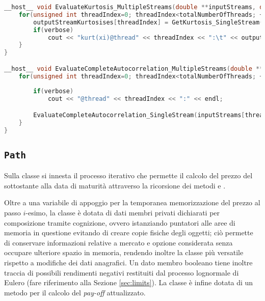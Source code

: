\begin{lstlisting}[language=C++, caption={\texttt{libraries/CoreLibraries/RandomGenerator/CorrelationToolbox.cu}}]
__host__ void EvaluateKurtosis_MultipleStreams(double **inputStreams, double *inputStreamAverages, double *inputStreamVariances, double *outputStreamKurtosises, unsigned int totalNumberOfThreads, unsigned int numbersToGeneratePerThread, bool verbose){
	for(unsigned int threadIndex=0; threadIndex<totalNumberOfThreads; ++threadIndex){
		outputStreamKurtosises[threadIndex] = GetKurtosis_SingleStream(inputStreams[threadIndex], inputStreamAverages[threadIndex], inputStreamVariances[threadIndex], numbersToGeneratePerThread);
		if(verbose)
			cout << "kurt(xi)@thread" << threadIndex << ":\t" << outputStreamKurtosises[threadIndex] << endl;
	}
}

__host__ void EvaluateCompleteAutocorrelation_MultipleStreams(double **inputStreams, double **outputStreamCorrelations, unsigned int totalNumberOfThreads, unsigned int numbersToGeneratePerThread, bool verbose){
	for(unsigned int threadIndex=0; threadIndex<totalNumberOfThreads; ++threadIndex){
				
		if(verbose)
			cout << "@thread" << threadIndex << ":" << endl;

		EvaluateCompleteAutocorrelation_SingleStream(inputStreams[threadIndex], outputStreamCorrelations[threadIndex], numbersToGeneratePerThread, verbose);
	}
}
\end{lstlisting}

\subsection{\texttt{Path}}
Sulla classe  si innesta il processo iterativo che permette il calcolo del prezzo del sottostante alla data di maturità attraverso la ricorsione dei metodi  e .

Oltre a una variabile di appoggio  per la temporanea memorizzazione del prezzo al passo $i$-esimo, la classe è dotata di dati membri privati dichiarati per composizione tramite cognizione, ovvero istanziando puntatori alle aree di memoria in questione evitando di creare copie fisiche degli oggetti; ciò permette di conservare informazioni relative a mercato e opzione considerata senza occupare ulteriore spazio in memoria, rendendo inoltre la classe più versatile rispetto a modifiche dei dati anagrafici. Un dato membro booleano  tiene inoltre traccia di possibili rendimenti negativi restituiti dal processo lognormale di Eulero (fare riferimento alla Sezione \ref{sec:limits}). La classe è infine dotata di un metodo per il calcolo del \textit{pay-off} attualizzato.

